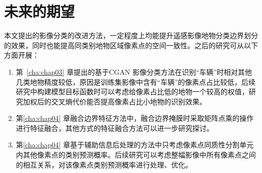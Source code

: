 \section{未来的期望}
\label{sec:5-2}
本文提出的影像分类的改进方法，一定程度上均能提升遥感影像地物分类边界划分的效果，同时也能提高同类别地物区域像素点的空间一致性。之后的研究可从以下方面开展：
\begin{enumerate}[(1)]
  \item  第~\ref{cha:chap03} 章提出的基于CGAN 影像分类方法在识别“车辆”时相对其他几类地物精度较低，原因是训练集影像中含有“车辆”的像素点占比较低，后续研究中构建模型目标函数时可以考虑给像素占比低的地物一个较高的权值，研究加权后的交叉熵代价能否提高像素占比小地物的识别效果。
  \item  第\ref{cha:chap04} 章融合边界特征方法中，融合边界掩膜时采取矩阵点乘的操作进行特征融合，其他方式的特征融合方法可以进一步研究探讨。
  \item  第\ref{cha:chap04} 章基于辅助信息后处理的方法中只考虑像素点同质性分割单元内其他像素点的类别预测概率。后续研究可以考虑整幅影像中所有像素点之间的相互关系，对该像素点类别预测概率进行处理、优化。
  
\end{enumerate}